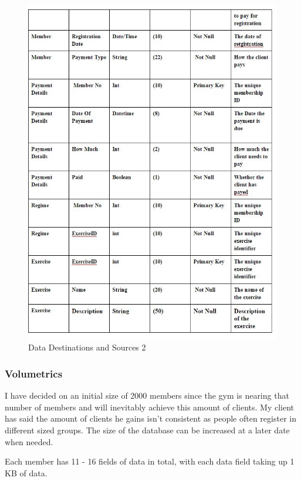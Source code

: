\begin{figure}[H]
    \includegraphics[width=\textwidth]{DataDictionaryProposed2.JPG}
    \caption{Data Destinations and Sources 2} \label{fig: Data Destinations and Sources 2 }
\end{figure}

\subsubsection{Volumetrics}

I have decided on an initial size of 2000 members since the gym is nearing that number of members and will inevitably achieve this amount of clients.  My client has said the amount of clients he gains isn't consistent as people often register in different sized groups. The size of the database can be increased at a later date when needed.  

Each member has 11 - 16 fields of data in total, with each data field taking up 1 KB of data.

